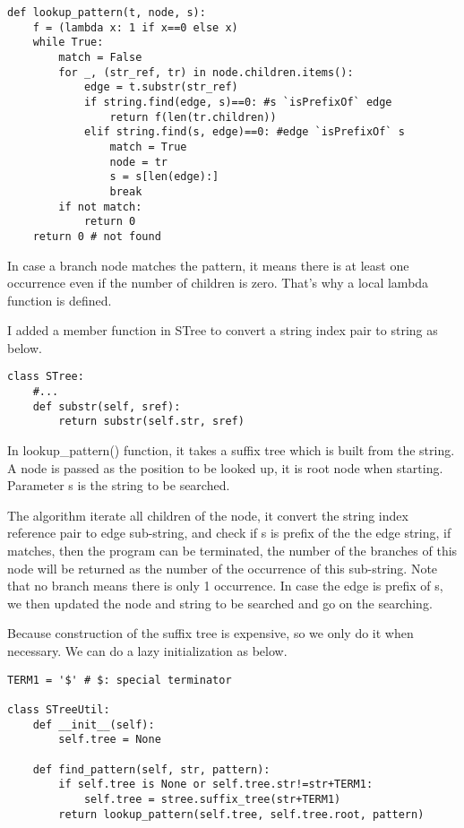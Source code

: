 \documentclass{article}
\begin{document}
\lstset{language=Python}
\begin{lstlisting}
def lookup_pattern(t, node, s):
    f = (lambda x: 1 if x==0 else x)
    while True:
        match = False
        for _, (str_ref, tr) in node.children.items():
            edge = t.substr(str_ref)
            if string.find(edge, s)==0: #s `isPrefixOf` edge
                return f(len(tr.children))
            elif string.find(s, edge)==0: #edge `isPrefixOf` s
                match = True
                node = tr
                s = s[len(edge):]
                break
        if not match:
            return 0
    return 0 # not found
\end{lstlisting}

In case a branch node matches the pattern, it means there is at least
one occurrence even if the number of children is zero. That's why
a local lambda function is defined.

I added a member function in STree to convert a string index
pair to string as below.

\begin{lstlisting}
class STree:
    #...
    def substr(self, sref):
        return substr(self.str, sref)
\end{lstlisting}

In lookup\_pattern() function, it takes a suffix tree which 
is built from the string.
A node is passed as the position to be looked up, it is root node when 
starting. Parameter s is the string to be searched.

The algorithm iterate all children of the node, it convert the string
index reference pair to edge sub-string, and check if s is prefix of the
the edge string, if matches, then the program can be terminated, the
number of the branches of this node will be returned as the number
of the occurrence of this sub-string. Note that no branch means there 
is only 1 occurrence. In case the edge is prefix of s, we then
updated the node and string to be searched and go on the searching.

Because construction of the suffix tree is expensive, so we only 
do it when necessary. We can do a lazy initialization as below.

\begin{lstlisting}
TERM1 = '$' # $: special terminator

class STreeUtil:
    def __init__(self):
        self.tree = None

    def find_pattern(self, str, pattern):
        if self.tree is None or self.tree.str!=str+TERM1:
            self.tree = stree.suffix_tree(str+TERM1)
        return lookup_pattern(self.tree, self.tree.root, pattern)
\end{lstlisting}
\end{document}
